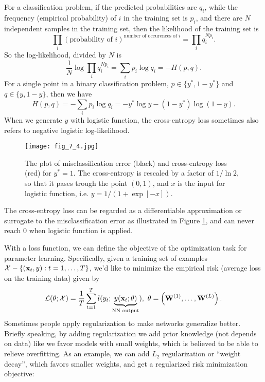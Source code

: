 \documentclass[../book-template.tex]{subfiles}
\begin{document}
For a classification problem, if the predicted probabilities are $q_i$, while the frequency (empirical probability) of $i$ in the training set is $p_i$, and there are $N$ independent samples in the training set, then the likelihood of the training set is
\begin{equation*}
	\prod_{i}(\text{probability of }i)^{\text{number of occurences of }i}=\prod_{i}q_i^{Np_i}.
\end{equation*}
So the log-likelihood, divided by $N$ is
\begin{equation*}
	\frac{1}{N}\log \prod_{i}q_i^{Np_i}=\sum_i p_i\log q_i=-H(p,q).
\end{equation*}
For a single point in a binary classification problem, $p\in \{y^*,1-y^*\}$ and $q\in \{y,1-y\}$, then we have
\begin{equation*}
	H(p,q) = -\sum_i p_i\log q_i=-y^*\log y-(1-y^*)\log(1-y).
\end{equation*}
When we generate $y$ with logistic function, the cross-entropy loss sometimes also refers to negative logistic log-likelihood. 
\begin{figure}[h] 
	\centering 
	\texttt{[image: fig\_7\_4.jpg]} 
	\caption{The plot of misclassification error (black) and cross-entropy loss (red) for $y^*=1$. The cross-entropy is rescaled by a factor of $1/\ln 2$, so that it pases trough the point $(0,1)$, and $x$ is the input for logistic function, i.e. $y=1/(1+\exp[-x])$.}\label{fig_7_4}
\end{figure}
\par The cross-entropy loss can be regarded as a differentiable approximation or surrogate to the misclassification error as illustrated in Figure \ref{fig_7_4}, and can never reach 0 when logistic function is applied.
\par With a loss function, we can define the objective of the optimization task for parameter learning. Specifically, given a training set of examples $\mathcal{X}-\{({\bf x}_t,y):t=1,\dots,T\}$, we'd like to minimize the empirical risk (average loss on the training data) given by
\begin{equation*}
	\mathcal{L}(\theta;\mathcal{X})=\frac{1}{T}\sum_{t=1}^{T}l(y_t;\underbrace{y({\bf x}_t;\theta)}_{\text{NN output}}),\ \theta=\left({\bf W}^{(1)},\dots,{\bf W}^{(L)}\right).
\end{equation*}
Sometimes people apply regularization to make networks generalize better. Briefly speaking, by adding regularization we add prior knowledge (not depends on data) like we favor models with small weights, which is believed to be able to relieve overfitting. As an example, we can add $L_2$ regularization or ``weight decay'', which favors smaller weights, and get a regularized risk minimization objective:
\end{document}
